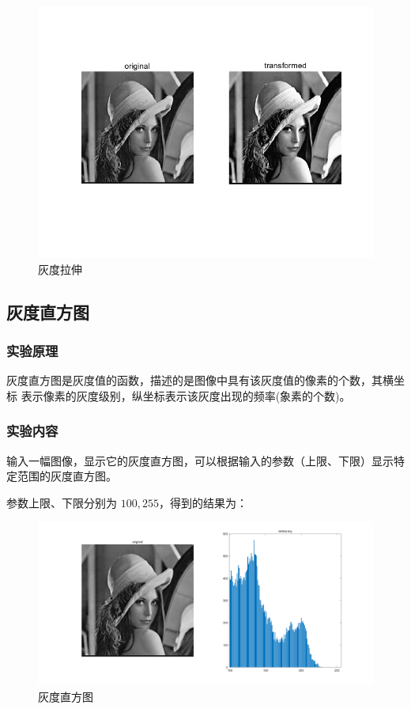 \documentclass{ctexart}
\begin{document}
\begin{figure}[H]
    \centering
    \includegraphics[scale=0.4]{2_2.png}
    \caption{灰度拉伸}
\end{figure}
\subsection{\hei 灰度直方图}
\subsubsection{\hei 实验原理}
灰度直方图是灰度值的函数，描述的是图像中具有该灰度值的像素的个数，其横坐标
表示像素的灰度级别，纵坐标表示该灰度出现的频率(象素的个数)。

\subsubsection{\hei 实验内容}
输入一幅图像，显示它的灰度直方图，可以根据输入的参数（上限、下限）显示特
定范围的灰度直方图。
\par 参数上限、下限分别为
$100, 255$，得到的结果为：
\begin{figure}[H]
    \centering
    \includegraphics[scale=0.2]{2_3.png}
    \caption{灰度直方图}
\end{figure}
\end{document}
